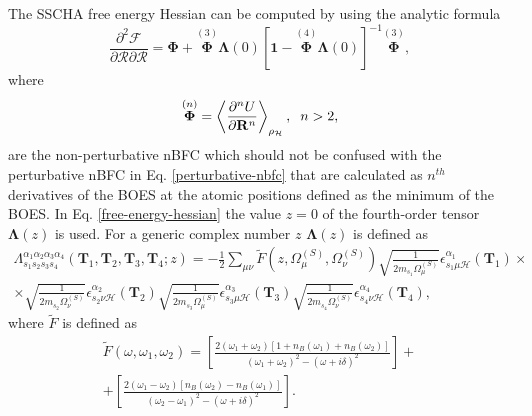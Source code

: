 The SSCHA free energy Hessian can be computed by using the analytic formula\cite{bianco2017second}
\begin{equation}
 \label{free-energy-hessian}
 \frac{\partial^{2}\mathcal{F}}{\partial\boldsymbol{\mathcal{R}}\partial\boldsymbol{\mathcal{R}}}=\boldsymbol{\Phi}+\overset{(3)}{\boldsymbol{\Phi}}\boldsymbol{\Lambda}(0)[\mathbf{1}-\overset{(4)}{\boldsymbol{
\Phi}}\boldsymbol{\Lambda}(0)]^{-1}\overset{(3)}{\boldsymbol{\Phi}},
\end{equation}
where 
\begin{equation}
 \overset{(n)}{\boldsymbol{\Phi}}=\left\langle\frac{\partial^{n}U}{\partial\mathbf{R}^{n}}\right\rangle_{\rho_{\mathcal{H}}}, \hspace{0.2cm} n>2,
\end{equation}
are the non-perturbative nBFC which should not be confused with the perturbative nBFC in Eq. \ref{perturbative-nbfc} that are calculated as $n^{th}$ derivatives of the BOES at the atomic positions defined as the minimum of 
the BOES. In Eq. \ref{free-energy-hessian} the value $z=0$ of the fourth-order tensor $\boldsymbol{\Lambda}(z)$ is used. For a generic complex number $z$ $\boldsymbol{\Lambda}(z)$ is defined as
\begin{multline}
\Lambda_{s_{1}s_{2}s_{3}s_{4}}^{\alpha_{1}\alpha_{2}\alpha_{3}\alpha_{4}}(\mathbf{T}_{1},\mathbf{T}_{2},\mathbf{T}_{3},\mathbf{T}_{4};z)=-\frac{1}{2}\sum_{\mu\nu}\tilde{F}(z,\Omega^{(S)}_{\mu},\Omega^{(S)}_{\nu})\sqrt{\frac{
	1}{2m_{s_{1}}\Omega^{(S)}_{\mu}}}\epsilon_{s_{1}\mu\mathcal{H}}^{\alpha_{1}}(\mathbf{T}_{1})\times\\\times\sqrt{\frac{1}{2m_{s_{2}}\Omega^{(S)}_{\nu}}}\epsilon_{s_{2}\nu\mathcal{H}}^{\alpha_{2}}(\mathbf{T}_{2})\sqrt{\frac{1}{2m_{
		s_{3}}\Omega^{(S)}_{\mu}}}\epsilon_{s_{3}\mu\mathcal{H}}^{\alpha_{3}}(\mathbf{T}_{3})\sqrt{\frac{1}{2m_{s_{4}}\Omega^{(S)}_{\nu}}}\epsilon_{s_{4}\nu\mathcal{H}}^{\alpha_{4}}(\mathbf{T}_{4}),
\end{multline}
where $\tilde{F}$ is defined as 
\begin{multline}
\label{raffaello-function}
 \tilde{F}(\omega,\omega_{1},\omega_{2})=\left[\frac{2(\omega_{1}+\omega_{2})[1+n_{B}(\omega_{1})+n_{B}(\omega_{2})]}{(\omega_{1}+\omega_{2})^{2}-(\omega+i\delta)^{2}}\right]+\\+\left[\frac{2(\omega_{1}-\omega_{2})[
 n_{B}(\omega_{2})-n_{B}(\omega_{1})]}{(\omega_{2}-\omega_{1})^{2}-(\omega+i\delta)^{2}}\right].
\end{multline}
\\

